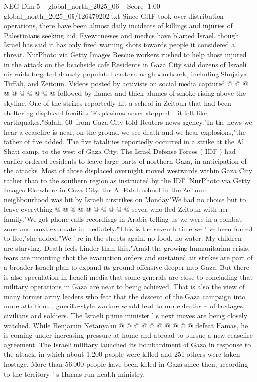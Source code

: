 \begin{textsample}{NEG Dim 5 – global\_north\_2025\_06 – Score -1.00 – global\_north\_2025\_06/126479202.txt}
Since GHF took over distribution operations, there have been almost daily incidents of killings and injuries of Palestinians seeking aid.
Eyewitnesses and medics have blamed Israel, though Israel has said it has only fired warning shots towards people it considered a threat.
NurPhoto via Getty Images Rescue workers rushed to help those injured in the attack on the beachside cafe Residents in Gaza City said dozens of Israeli air raids targeted densely populated eastern neighbourhoods, including Shujaiya, Tuffah, and Zeitoun.
Videos posted by activists on social media captured @ @ @ @ @ @ @ @ @ @ followed by flames and thick plumes of smoke rising above the skyline.
One of the strikes reportedly hit a school in Zeitoun that had been sheltering displaced families."Explosions never stopped... it felt like earthquakes,"Salah, 60, from Gaza City told Reuters news agency."In the news we hear a ceasefire is near, on the ground we see death and we hear explosions,"the father of five added.
The five fatalities reportedly occurred in a strike at the Al Shati camp, to the west of Gaza City.
The Israel Defense Forces ( IDF ) had earlier ordered residents to leave large parts of northern Gaza, in anticipation of the attacks.
Most of those displaced overnight moved westwards within Gaza City rather than to the southern region as instructed by the IDF.
NurPhoto via Getty Images Elsewhere in Gaza City, the Al-Falah school in the Zeitoun neighbourhood was hit by Israeli airstrikes on Monday"We had no choice but to leave everything @ @ @ @ @ @ @ @ @ @ seven who fled Zeitoun with her family."We got phone calls recordings in Arabic telling us we were in a combat zone and must evacuate immediately."This is the seventh time we ' ve been forced to flee,"she added."We ' re in the streets again, no food, no water.
My children are starving.
Death feels kinder than this."Amid the growing humanitarian crisis, fears are mounting that the evacuation orders and sustained air strikes are part of a broader Israeli plan to expand its ground offensive deeper into Gaza.
But there is also speculation in Israeli media that some generals are close to concluding that military operations in Gaza are near to being achieved.
That is also the view of many former army leaders who fear that the descent of the Gaza campaign into more attritional, guerilla-style warfare would lead to more deaths -- of hostages, civilians and soldiers.
The Israeli prime minister ' s next moves are being closely watched.
While Benjamin Netanyahu @ @ @ @ @ @ @ @ @ @ defeat Hamas, he is coming under increasing pressure at home and abroad to pursue a new ceasefire agreement.
The Israeli military launched its bombardment of Gaza in response to the attack, in which about 1,200 people were killed and 251 others were taken hostage.
More than 56,000 people have been killed in Gaza since then, according to the territory ' s Hamas-run health ministry.

\end{textsample}

